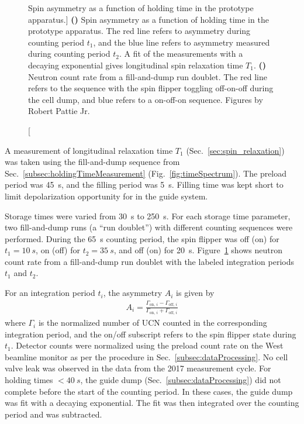 \begin{figure}
\begin{subfigure}{.5\textwidth}
  \caption{}\label{subfig:ramsey2017_t1_doublet}
\end{subfigure}
\caption
    [Spin asymmetry as a function of holding time in the prototype apparatus.]
    {\textbf{()} Spin asymmetry as a function of holding time in the prototype apparatus. The red line refers to asymmetry during counting period $t_1$, and the blue line refers to asymmetry measured during counting period $t_2$. A fit of the measurements with a decaying exponential gives longitudinal spin relaxation time $T_1$. \textbf{()} Neutron count rate from a fill-and-dump run doublet. The red line refers to the sequence with the spin flipper toggling off-on-off during the cell dump, and blue refers to a on-off-on sequence. Figures by Robert Pattie Jr.}
\label{fig:ramsey_2017_t1}
\end{figure}

A measurement of longitudinal relaxation time $T_1$ (Sec.~\ref{sec:spin_relaxation}) was taken using the fill-and-dump sequence from Sec.~\ref{subsec:holdingTimeMeasurement} (Fig.~\ref{fig:timeSpectrum}). The preload period was \qty{45}{\second}, and the filling period was \qty{5}{\second}. Filling time was kept short to limit depolarization opportunity for \ucn in the guide system.

Storage times were varied from \qty{30}{\second} to \qty{250}{\second}. For each storage time parameter, two fill-and-dump runs (a ``run doublet'') with different counting sequences were performed. During the \qty{65}{\second} counting period, the spin flipper was off (on) for $t_1=\qty{10}{s}$, on (off) for $t_2=\qty{35}{s}$, and off (on) for \qty{20}{\second}. Figure~\ref{subfig:ramsey2017_t1_doublet} shows neutron count rate from a fill-and-dump run doublet with the labeled integration periods $t_1$ and $t_2$.

For an integration period $t_i$, the asymmetry $A_i$ is given by
%
\begin{gather}
    A_i=\frac{\Gamma_{\text{on, }i}-\Gamma_{\text{off, }i}}{\Gamma_{\text{on, }i}+\Gamma_{\text{off, }i}}
    \label{eq:spin_asymmetry} 
\end{gather}
%
where $\Gamma_i$ is the normalized number of UCN counted in the corresponding integration period, and the on/off subscript refers to the spin flipper state during $t_1$. Detector counts were normalized using the preload count rate on the West beamline monitor as per the procedure in Sec.~\ref{subsec:dataProcessing}. No cell valve leak was observed in the data from the 2017 measurement cycle. For holding times $<\qty{40}{s}$, the guide dump (Sec.~\ref{subsec:dataProcessing}) did not complete before the start of the counting period. In these cases, the guide dump was fit with a decaying exponential. The fit was then integrated over the counting period and was subtracted.

